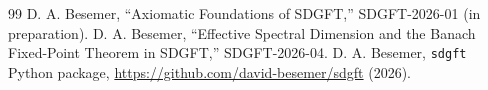 \documentclass[amsmath,amssymb,aps,prd,twocolumn,superscriptaddress,nofootinbib]{revtex4-2}
\begin{document}
\begin{thebibliography}{99}
 D. A. Besemer, ``Axiomatic Foundations of SDGFT,'' SDGFT-2026-01 (in preparation).
 D. A. Besemer, ``Effective Spectral Dimension and the Banach Fixed-Point Theorem in SDGFT,'' SDGFT-2026-04.
 D. A. Besemer, \texttt{sdgft} Python package, \url{https://github.com/david-besemer/sdgft} (2026).
\end{thebibliography}
\end{document}
